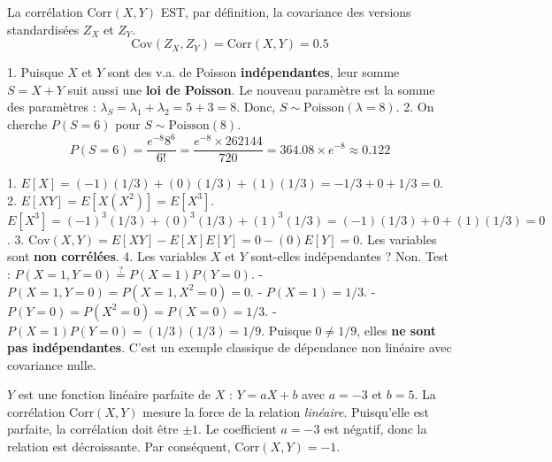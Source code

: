 \begin{correctionbox}
La corrélation $\text{Corr}(X,Y)$ EST, par définition, la covariance des versions standardisées $Z_X$ et $Z_Y$.
$$ \text{Cov}(Z_X, Z_Y) = \text{Corr}(X,Y) = 0.5 $$
\end{correctionbox}

\begin{correctionbox}
1.  Puisque $X$ et $Y$ sont des v.a. de Poisson \textbf{indépendantes}, leur somme $S=X+Y$ suit aussi une \textbf{loi de Poisson}.
    Le nouveau paramètre est la somme des paramètres : $\lambda_S = \lambda_1 + \lambda_2 = 5 + 3 = 8$.
    Donc, $S \sim \text{Poisson}(\lambda=8)$.
2.  On cherche $P(S=6)$ pour $S \sim \text{Poisson}(8)$.
    $$ P(S=6) = \frac{e^{-8} 8^6}{6!} = \frac{e^{-8} \times 262144}{720} = 364.08 \times e^{-8} \approx 0.122 $$
\end{correctionbox}

\begin{correctionbox}
1.  $E[X] = (-1)(1/3) + (0)(1/3) + (1)(1/3) = -1/3 + 0 + 1/3 = 0$.
2.  $E[XY] = E[X(X^2)] = E[X^3]$.
    $E[X^3] = (-1)^3(1/3) + (0)^3(1/3) + (1)^3(1/3) = (-1)(1/3) + 0 + (1)(1/3) = 0$.
3.  $\text{Cov}(X,Y) = E[XY] - E[X]E[Y] = 0 - (0)E[Y] = 0$.
    Les variables sont \textbf{non corrélées}.
4.  Les variables $X$ et $Y$ sont-elles indépendantes ? Non.
    Test : $P(X=1, Y=0) \stackrel{?}{=} P(X=1)P(Y=0)$.
    - $P(X=1, Y=0) = P(X=1, X^2=0) = 0$.
    - $P(X=1) = 1/3$.
    - $P(Y=0) = P(X^2=0) = P(X=0) = 1/3$.
    - $P(X=1)P(Y=0) = (1/3)(1/3) = 1/9$.
    Puisque $0 \neq 1/9$, elles \textbf{ne sont pas indépendantes}.
    C'est un exemple classique de dépendance non linéaire avec covariance nulle.
\end{correctionbox}

\begin{correctionbox}
$Y$ est une fonction linéaire parfaite de $X$ : $Y = aX + b$ avec $a=-3$ et $b=5$.
La corrélation $\text{Corr}(X,Y)$ mesure la force de la relation \textit{linéaire}. Puisqu'elle est parfaite, la corrélation doit être $\pm 1$.
Le coefficient $a = -3$ est négatif, donc la relation est décroissante.
Par conséquent, $\text{Corr}(X,Y) = -1$.
\end{correctionbox}

